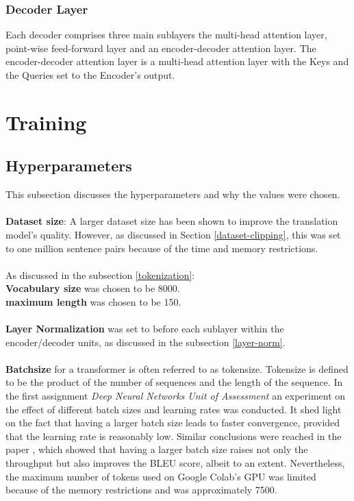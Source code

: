 \documentclass[12pt,a4paper,twoside,openright]{report}
\begin{document}
\subsubsection{Decoder Layer}
Each decoder comprises three main sublayers the multi-head attention layer, point-wise feed-forward layer and an encoder-decoder attention layer. The encoder-decoder attention layer is a multi-head attention layer with the Keys and the Queries set to the Encoder's output.


\section{Training}
\label{training}

\subsection{Hyperparameters}
\label{hyperparameters}

This subsection discusses the hyperparameters and why the values were chosen.
\\\\
\textbf{Dataset size}: A larger dataset size has been shown to improve the translation model's quality. However, as discussed in Section \ref{dataset-clipping}, this was set to one million sentence pairs because of the time and memory restrictions.
\\\\
As discussed in the subsection \ref{tokenization}:\\
\textbf{Vocabulary size} was chosen to be 8000.
\\
\textbf{maximum length} was chosen to be 150.
\\\\
\textbf{Layer Normalization} was set to before each sublayer within the encoder/decoder units, as discussed in the subsection \ref{layer-norm}.
\\\\
\textbf{Batchsize} for a transformer is often referred to as tokensize. Tokensize is defined to be the product of the number of sequences and the length of the sequence. In the first assignment \textit{Deep Neural Networks Unit of Assessment} an experiment on the effect of different batch sizes and learning rates was conducted. It shed light on the fact that having a larger batch size leads to faster convergence, provided that the learning rate is reasonably low. Similar conclusions were reached in the paper \cite{training-tips}, which showed that having a larger batch size raises not only the throughput but also improves the BLEU score, albeit to an extent. Nevertheless, the maximum number of tokens used on Google Colab's GPU was limited because of the memory restrictions and was approximately 7500.
\end{document}
